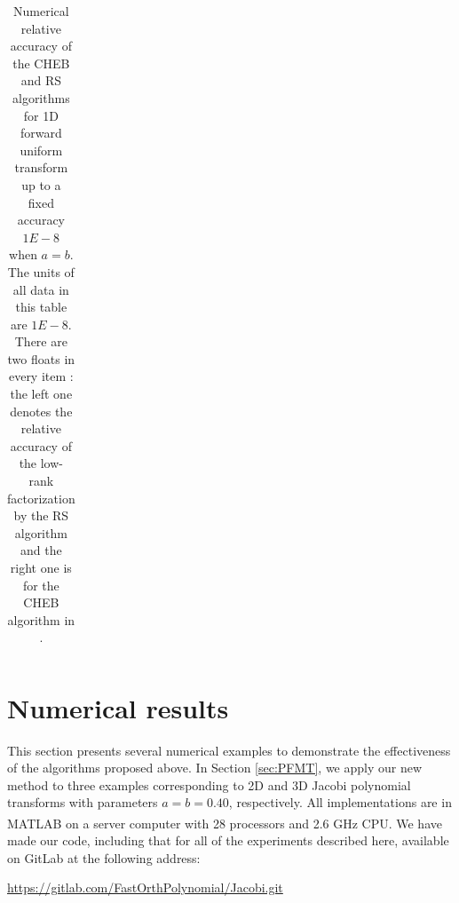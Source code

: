 \documentclass[11pt]{article}
\begin{document}
\begin{table}
\begin{center}
\begin{tabular}{c|c|c|c|c|c|c}
\end{tabular}
\caption{Numerical relative accuracy of the CHEB and RS algorithms for 1D forward uniform transform up to a fixed accuracy $1E-8$ when $a=b$. The units of all data in this table are $1E-8$. There are two floats in every item : the left one denotes the relative accuracy of the low-rank factorization by the RS algorithm and the right one is for the CHEB algorithm in \cite{Jacobi}. }
\label{table2}
\end{center}
\end{table}


\section{Numerical results}
\label{sec:results}
This section presents several numerical examples to demonstrate the effectiveness of the algorithms
proposed above. {\color{blue}{}}{} In Section \ref{sec:PFMT}, we apply our new method to three examples corresponding to 2D and 3D Jacobi polynomial transforms with parameters $a=b=0.40$, respectively.  All implementations are in MATLAB\textsuperscript{\textregistered} on a server computer with 28 processors and 2.6 GHz CPU. {\color{blue}{But only one processor was used in all experiments.}}  We have made our code, including that for all of the experiments described here,
available on GitLab at the following address:
  \begin{center}
\url{https://gitlab.com/FastOrthPolynomial/Jacobi.git}
  \end{center}
\end{document}
